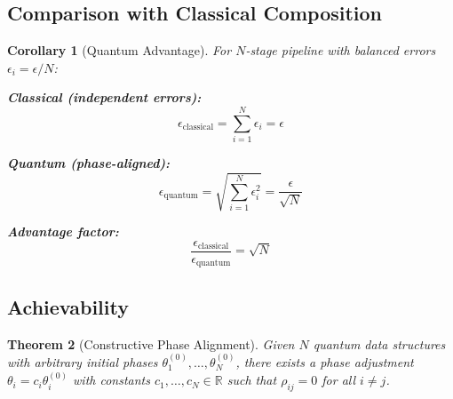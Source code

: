 \documentclass[11pt]{article}
\newtheorem{theorem}{Theorem}
\newtheorem{corollary}[theorem]{Corollary}
\begin{document}
\subsection{Comparison with Classical Composition}

\begin{corollary}[Quantum Advantage]
For $N$-stage pipeline with balanced errors $\epsilon_i = \epsilon/N$:

\textbf{Classical (independent errors):}
\begin{equation}
\epsilon_{\text{classical}} = \sum_{i=1}^N \epsilon_i = \epsilon
\end{equation}

\textbf{Quantum (phase-aligned):}
\begin{equation}
\epsilon_{\text{quantum}} = \sqrt{\sum_{i=1}^N \epsilon_i^2} = \frac{\epsilon}{\sqrt{N}}
\end{equation}

\textbf{Advantage factor:}
\begin{equation}
\frac{\epsilon_{\text{classical}}}{\epsilon_{\text{quantum}}} = \sqrt{N}
\end{equation}
\end{corollary}

\subsection{Achievability}

\begin{theorem}[Constructive Phase Alignment]
\label{thm:constructive_alignment}
Given $N$ quantum data structures with arbitrary initial phases $\theta_1^{(0)}, \ldots, \theta_N^{(0)}$, there exists a phase adjustment $\theta_i = c_i \theta_i^{(0)}$ with constants $c_1, \ldots, c_N \in \mathbb{R}$ such that $\rho_{ij} = 0$ for all $i \neq j$.
\end{theorem}
\end{document}
